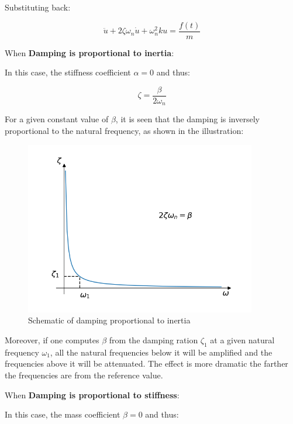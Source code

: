 \documentclass[10pt,b5paper,titlepage]{book}
\begin{document}
Substituting back:

\begin{equation}
    \ddot{u} + 2 \zeta \omega_n \dot{u} + \omega_n^2 k u = \frac{f(t)}{m}
\end{equation}


When \textbf{Damping is proportional to inertia}:

In this case, the stiffness coefficient $ \alpha = 0 $ and thus:

\begin{equation}
    \zeta = \frac{\beta}{2 \omega_n}
\end{equation}

For a given constant value of $ \beta $, it is seen that the damping is inversely
proportional to the natural frequency, as shown in the illustration:

\begin{figure}[ht]
    \centering
    \includegraphics[width=0.90\textwidth]{img/inertia_dependent_damping.png}
    \caption{Schematic of damping proportional to inertia}
    \label{fig:inertia-dependent-damping-png}
\end{figure}

Moreover, if one computes $ \beta $ from the damping ration $ \zeta_1 $ at a given
natural frequency $ \omega_1 $, all the natural frequencies below it will be amplified
and the frequencies above it will be attenuated. The effect is more dramatic the farther
the frequencies are from the reference value.

When \textbf{Damping is proportional to stiffness}:

In this case, the mass coefficient $ \beta = 0 $ and thus:
\end{document}
